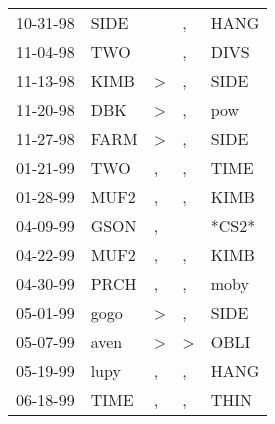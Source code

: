 \begin{supertabular}{p{0.07\textwidth}p{0.06\textwidth}p{0.02\textwidth}p{0.02\textwidth}p{0.06\textwidth}}
          10-31-98\textsuperscript{} &          SIDE\textsuperscript{} &               &                , &           HANG\textsuperscript{} \\
          11-04-98\textsuperscript{} &           TWO\textsuperscript{} &               &                , &           DIVS\textsuperscript{} \\
          11-13-98\textsuperscript{} &          KIMB\textsuperscript{} &  \textgreater &                , &           SIDE\textsuperscript{} \\
          11-20-98\textsuperscript{} &           DBK\textsuperscript{} &  \textgreater &                , &            pow\textsuperscript{} \\
          11-27-98\textsuperscript{} &          FARM\textsuperscript{} &  \textgreater &                , &           SIDE\textsuperscript{} \\
          01-21-99\textsuperscript{} &           TWO\textsuperscript{} &             , &                , &           TIME\textsuperscript{} \\
          01-28-99\textsuperscript{} &          MUF2\textsuperscript{} &             , &                , &           KIMB\textsuperscript{} \\
          04-09-99\textsuperscript{} &          GSON\textsuperscript{} &             , &                  &                            *CS2* \\
          04-22-99\textsuperscript{} &          MUF2\textsuperscript{} &             , &                , &           KIMB\textsuperscript{} \\
          04-30-99\textsuperscript{} &          PRCH\textsuperscript{} &             , &                , &           moby\textsuperscript{} \\
          05-01-99\textsuperscript{} &          gogo\textsuperscript{} &  \textgreater &                , &           SIDE\textsuperscript{} \\
          05-07-99\textsuperscript{} &          aven\textsuperscript{} &  \textgreater &     \textgreater &           OBLI\textsuperscript{} \\
          05-19-99\textsuperscript{} &          lupy\textsuperscript{} &             , &                , &           HANG\textsuperscript{} \\
          06-18-99\textsuperscript{} &          TIME\textsuperscript{} &             , &                , &           THIN\textsuperscript{} \\

\end{supertabular}
